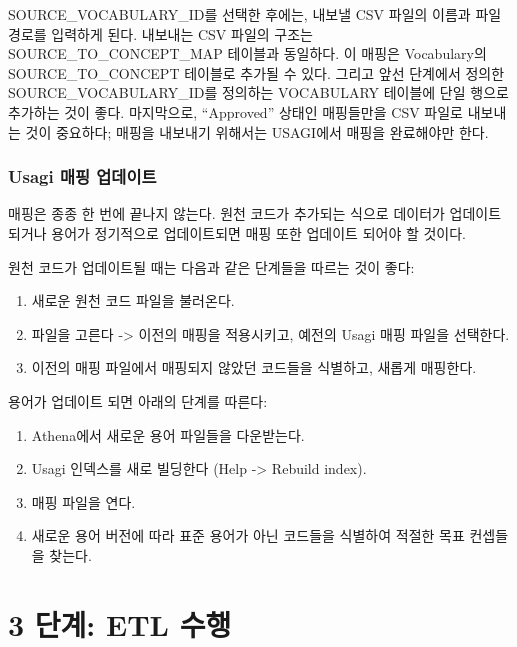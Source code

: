 \documentclass[11pt]{book}
\providecommand{\tightlist}{%
  \setlength{\itemsep}{0pt}\setlength{\parskip}{0pt}}
\theoremstyle{definition}
\theoremstyle{definition}
\theoremstyle{definition}
\theoremstyle{remark}
\begin{document}
SOURCE\_VOCABULARY\_ID를 선택한 후에는, 내보낼 CSV 파일의 이름과 파일
경로를 입력하게 된다. 내보내는 CSV 파일의 구조는
SOURCE\_TO\_CONCEPT\_MAP 테이블과 동일하다. 이 매핑은 Vocabulary의
SOURCE\_TO\_CONCEPT 테이블로 추가될 수 있다. 그리고 앞선 단계에서 정의한
SOURCE\_VOCABULARY\_ID를 정의하는 VOCABULARY 테이블에 단일 행으로
추가하는 것이 좋다. 마지막으로, ``Approved'' 상태인 매핑들만을 CSV
파일로 내보내는 것이 중요하다; 매핑을 내보내기 위해서는 USAGI에서 매핑을
완료해야만 한다.

\subsubsection*{Usagi 매핑 업데이트}\label{usagi--}

매핑은 종종 한 번에 끝나지 않는다. 원천 코드가 추가되는 식으로 데이터가
업데이트 되거나 용어가 정기적으로 업데이트되면 매핑 또한 업데이트 되어야
할 것이다.

원천 코드가 업데이트될 때는 다음과 같은 단계들을 따르는 것이 좋다:

\begin{enumerate}
\def\labelenumi{\arabic{enumi}.}
\tightlist
\item
  새로운 원천 코드 파일을 불러온다.
\item
  파일을 고른다 -\textgreater{} 이전의 매핑을 적용시키고, 예전의 Usagi
  매핑 파일을 선택한다.
\item
  이전의 매핑 파일에서 매핑되지 않았던 코드들을 식별하고, 새롭게
  매핑한다.
\end{enumerate}

용어가 업데이트 되면 아래의 단계를 따른다:

\begin{enumerate}
\def\labelenumi{\arabic{enumi}.}
\tightlist
\item
  Athena에서 새로운 용어 파일들을 다운받는다.
\item
  Usagi 인덱스를 새로 빌딩한다 (Help -\textgreater{} Rebuild index).
\item
  매핑 파일을 연다.
\item
  새로운 용어 버전에 따라 표준 용어가 아닌 코드들을 식별하여 적절한 목표
  컨셉들을 찾는다.
\end{enumerate}

\section{3 단계: ETL 수행}\label{-etl-}
\end{document}
